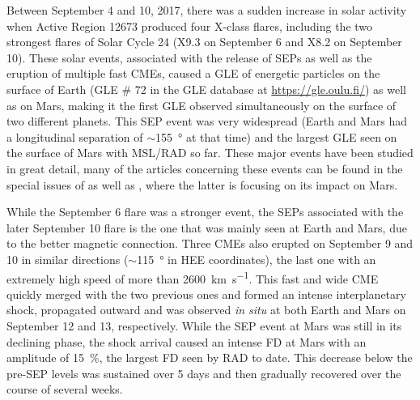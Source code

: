 Between September 4 and 10, 2017, there was a sudden increase in solar activity when Active Region 12673 produced four X-class flares, including the two strongest flares of Solar Cycle 24 (X9.3 on September 6 and X8.2 on September 10).
These solar events, associated with the release of \acp{SEP} as well as the eruption of multiple fast \acp{CME}, caused a \ac{GLE} of energetic particles on the surface of Earth (\ac{GLE} \# 72 in the \ac{GLE} database at \url{https://gle.oulu.fi/}) as well as on Mars, making it the first \ac{GLE} observed simultaneously on the surface of two different planets.
This \ac{SEP} event was very widespread (Earth and Mars had a longitudinal separation of $\sim$\SI{155}{\degree} at that time) and the largest GLE seen on the surface of Mars with \ac{MSL}/\ac{RAD} so far.
These major events have been studied in great detail, many of the articles concerning these events can be found in the special issues of \citet{SpaceWeather-2018-special-issue-September-event} as well as \citet{GRL-2018-special-issue-September-event}, where the latter is focusing on its impact on Mars.


While the September 6 flare was a stronger event, the \acp{SEP} associated with the later September 10 flare is the one that was mainly seen at Earth and Mars, due to the better magnetic connection. Three CMEs also erupted on September 9 and 10 in similar directions ($\sim$\SI{115}{\degree} in \ac{HEE} coordinates), the last one with an extremely high speed of more than \SI{2600}{\kilo\meter\per\second}. This fast and wide CME quickly merged with the two previous ones and formed an intense interplanetary shock, propagated outward and was observed \textit{in situ} at both Earth and Mars on September 12 and 13, respectively. While the \ac{SEP} event at Mars was still in its declining phase, the shock arrival caused an intense \ac{FD} at Mars with an amplitude of \SI{15}{\percent}, the largest \ac{FD} seen by \ac{RAD} to date. This decrease below the pre-\ac{SEP} levels was sustained over 5 days and then gradually recovered over the course of several weeks.

